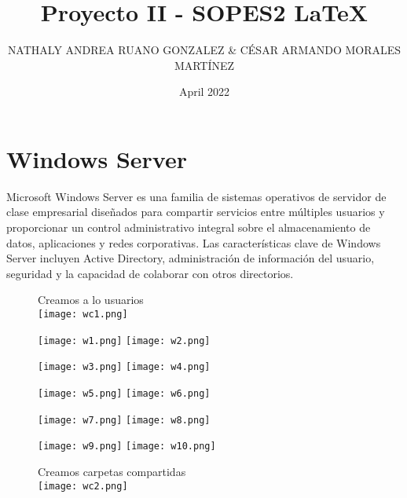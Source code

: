 \documentclass{article}
\title{Proyecto II - SOPES2 \LaTeX{}}
\author{NATHALY ANDREA RUANO GONZALEZ & CÉSAR ARMANDO MORALES MARTÍNEZ}
\date{April 2022}
\begin{document}
\maketitle
\section{Windows Server}
Microsoft Windows Server es una familia de sistemas operativos de servidor de clase empresarial diseñados para compartir servicios entre múltiples usuarios y proporcionar un control administrativo integral sobre el almacenamiento de datos, aplicaciones y redes corporativas. Las características clave de Windows Server incluyen Active Directory, administración de información del usuario, seguridad y la capacidad de colaborar con otros directorios.\\

\begin{figure}[htp]
Creamos a lo usuarios\\
\centering
\texttt{[image: wc1.png]}
\end{figure}


\begin{figure}[htp]
\centering
\texttt{[image: w1.png]}
\texttt{[image: w2.png]}
\end{figure}


\begin{figure}[htp]
\centering
\texttt{[image: w3.png]}
\texttt{[image: w4.png]}

\end{figure}

\begin{figure}[htp]
\centering
\texttt{[image: w5.png]}
\texttt{[image: w6.png]}
\end{figure}


\begin{figure}[htp]
\centering
\texttt{[image: w7.png]}
\texttt{[image: w8.png]}

\end{figure}

\begin{figure}[htp]
\centering

\texttt{[image: w9.png]}
\texttt{[image: w10.png]}
\end{figure}





\begin{figure}[htp]
Creamos carpetas compartidas\\
\centering
\texttt{[image: wc2.png]}
\end{figure}
\end{document}
